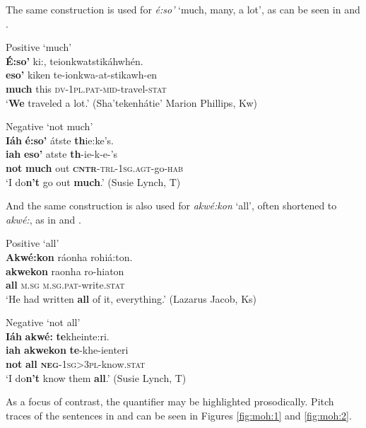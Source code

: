 \documentclass[output=paper,colorlinks,citecolor=brown]{langscibook}
\begin{document}
The same construction is used for \textit{é:so’} ‘much, many, a lot’, as can be seen in  and .

\ea\label{ex:moh:81}Positive ‘much’\\
    \glll \textbf{É:so’} ki:, teionkwatstikáhwhén. \\ 
         \textbf{eso’} kiken te-ionkwa-at-stikawh-en \\
         \textbf{much} this \textsc{dv-1pl.pat-mid-}travel-\textsc{stat}\\
    \glt ‘\textbf{We} traveled a lot.’ (Sha’tekenhátie’ Marion Phillips, Kw)
\z 

\ea\label{ex:moh:82}Negative ‘not much’\\
    \glll \textbf{Iáh} \textbf{é:so’} átste \textbf{th}ie:ke’s. \\
         \textbf{iah} \textbf{eso’} atste \textbf{th}-ie-k-e-’s \\
         \textbf{not} \textbf{much} out \textsc{\textbf{cntr}-trl-1sg.agt}-go-\textsc{hab}\\
    \glt ‘I do\textbf{n’t} go out \textbf{much}.’ (Susie Lynch, T)
\z

And the same construction is also used for \textit{akwé:kon} ‘all’, often shortened to \textit{akwé:}, as in  and .

\ea\label{ex:moh:83}Positive ‘all’\\
    \glll \textbf{Akwé:kon} ráonha rohiá:ton. \\
         \textbf{akwekon} raonha   ro-hiaton \\
         \textbf{all} \textsc{m.sg} \textsc{m.sg.pat}-write.\textsc{stat}\\
    \glt ‘He had written \textbf{all} of it, everything.’ (Lazarus Jacob, Ks)
\z

\ea\label{ex:moh:84}Negative ‘not all’\\
    \glll \textbf{Iáh} \textbf{akwé:} \textbf{te}kheinte:ri. \\
         \textbf{iah} \textbf{akwekon} \textbf{te}-khe-ienteri\\
         \textbf{not} \textbf{all} \textsc{\textbf{neg}-1sg>3pl}-know.\textsc{stat} \\
    \glt ‘I do\textbf{n’t} know them \textbf{all}.’ (Susie Lynch, T)
\z

As a focus of contrast, the quantifier may be highlighted prosodically. Pitch traces of the sentences in  and  can be seen in Figures \ref{fig:moh:1} and \ref{fig:moh:2}.
\end{document}
